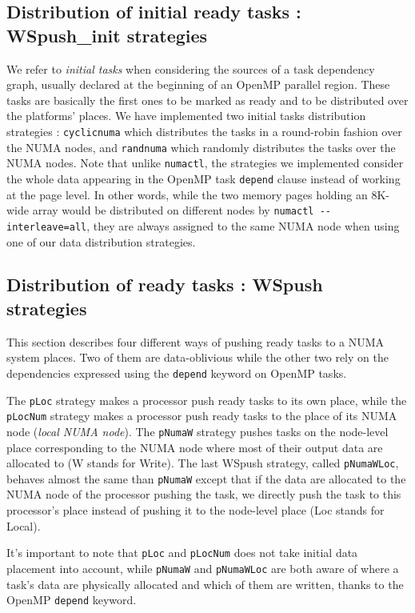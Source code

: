\documentclass[parallelisme]{compas2016}
\begin{document}
\subsection{Distribution of initial ready tasks : WSpush\_init strategies}
We refer to \emph{initial tasks} when considering the sources of a task dependency graph, usually declared at the beginning of an OpenMP parallel region.
These tasks are basically the first ones to be marked as ready and to be distributed over the platforms' places.
We have implemented two initial tasks distribution strategies : \verb!cyclicnuma! which distributes the tasks in a round-robin fashion over the NUMA nodes, and \verb!randnuma! which randomly distributes the tasks over the NUMA nodes.
Note that unlike \verb!numactl!, the strategies we implemented consider the whole data appearing in the OpenMP task \verb!depend! clause instead of working at the page level. In other words, while the two memory pages holding an 8K-wide array would be distributed on different nodes by \verb!numactl --interleave=all!, they are always assigned to the same NUMA node when using one of our data distribution strategies.

\subsection{Distribution of ready tasks : WSpush strategies}

This section describes four different ways of pushing ready tasks to a NUMA system places.
Two of them are data-oblivious while the other two rely on the dependencies expressed using the \verb!depend! keyword on OpenMP tasks.

The \verb/pLoc/ strategy makes a processor push ready tasks to
    its own place, while the \verb/pLocNum/ strategy makes a processor push ready tasks to the place of its NUMA node (\emph{local NUMA node}).
The \verb/pNumaW/ strategy pushes tasks on the node-level place corresponding to the NUMA node where most of their output data are allocated to (W stands for Write).
The last WSpush strategy, called \verb/pNumaWLoc/, behaves almost the same than \verb!pNumaW! except that if
    the data are allocated to the NUMA node of the processor pushing the task, we directly push the task to this processor's place instead of pushing it to the node-level place (Loc stands for Local).
    
    It's important to note that \verb!pLoc! and \verb!pLocNum! does not take initial data placement into account, while \verb!pNumaW! and \verb!pNumaWLoc! are both aware of where a task's data are physically allocated and which of them are written, thanks to the OpenMP \verb!depend! keyword.
\end{document}
